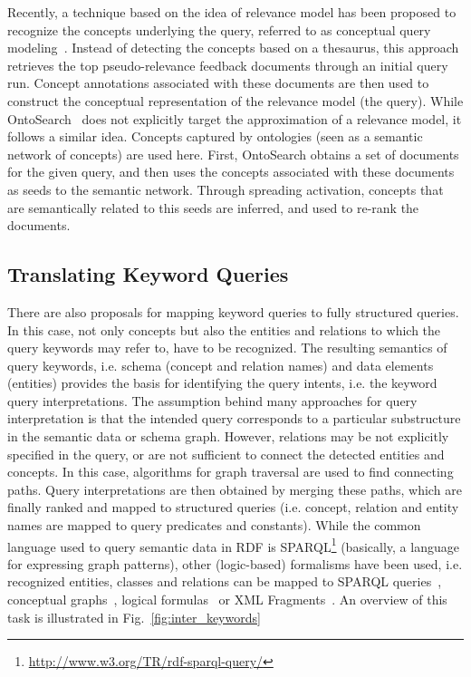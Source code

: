 Recently, a technique based on the idea of relevance model has been proposed to recognize the concepts underlying the query, referred to as conceptual query modeling~\cite{DBLP:journals/ipm/MeijTRK10}. Instead of detecting the concepts based on a thesaurus, this approach retrieves the top pseudo-relevance feedback documents through an initial query run. Concept annotations associated with these documents are then used to construct the conceptual representation of the relevance model (the query). While OntoSearch~\cite{DBLP:conf/aaai/JiangT06} does not explicitly target the approximation of a relevance model, it follows a similar idea. Concepts captured by ontologies (seen as a semantic network of concepts) are used here.  First, OntoSearch obtains a set of documents for the given query, and then uses the concepts associated with these documents as seeds to the semantic network. Through spreading activation, concepts that are semantically related to this seeds are inferred, and used to re-rank the documents. 
	
\subsection{Translating Keyword Queries} 
There are also proposals for mapping keyword queries to fully structured queries. In this case, not only concepts but also the entities and relations to which the query keywords may refer to, have to be recognized. The resulting semantics of query keywords, i.e. schema (concept and relation names) and data elements (entities) provides the basis for identifying the query intents, i.e. the keyword query interpretations. The assumption behind many approaches for query interpretation is that the intended query corresponds to a particular substructure in the semantic data or schema graph. However, relations may be not explicitly specified in the query, or are not sufficient to connect the detected entities and concepts. In this case, algorithms for graph traversal are used to find connecting paths. Query interpretations are then obtained by merging these paths, which are finally ranked and mapped to structured queries (i.e. concept, relation and entity names are mapped to query predicates and constants). While the common language used to query semantic data in RDF is SPARQL\footnote{\url{http://www.w3.org/TR/rdf-sparql-query/}} (basically, a language for expressing graph patterns), other (logic-based) formalisms have been used, i.e. recognized entities, classes and relations can be mapped to SPARQL queries~\cite{DBLP:conf/esws/DamljanovicAC10}, 
conceptual graphs~\cite{DBLP:conf/aswc/CaoCT08}, logical formulas~\cite{DBLP:journals/dke/CimianoHHMS08} or XML Fragments~\cite{DBLP:conf/sigir/Chu-CarrollPCFD06}. An overview of this task is illustrated in Fig.~\ref{fig:inter_keywords}

